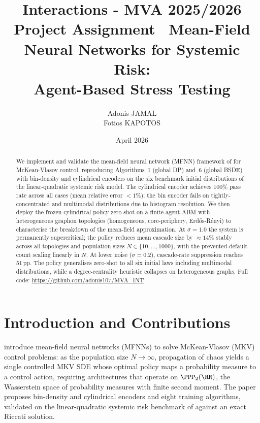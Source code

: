 \documentclass[11pt]{article}
\title{Interactions - MVA 2025/2026
      \\ \Large{Project Assignment}
      \ \Large{Mean-Field Neural Networks for Systemic Risk:\\Agent-Based Stress Testing}}
\author{
Adonis JAMAL \email{adonis.jamal@student-cs.fr}\\
Fotios KAPOTOS \email{fotiskapotos@gmail.com}
}
\date{April 2026}
\begin{document}
\maketitle


\begin{abstract}
We implement and validate the mean-field neural network (MFNN) framework of \citet{pham2024mfnn} for McKean-Vlasov control, reproducing Algorithms~1 (global DP) and~6 (global BSDE) with bin-density and cylindrical encoders on the six benchmark initial distributions of the linear-quadratic systemic risk model. The cylindrical encoder achieves 100\% pass rate across all cases (mean relative error $< 1\%$); the bin encoder fails on tightly-concentrated and multimodal distributions due to histogram resolution. We then deploy the frozen cylindrical policy zero-shot on a finite-agent ABM with heterogeneous graphon topologies (homogeneous, core-periphery, Erdős-Rényi) to characterise the breakdown of the mean-field approximation. At $\sigma = 1.0$ the system is permanently supercritical; the policy reduces mean cascade size by ${\approx}14\%$ stably across all topologies and population sizes $N \in \{10, \ldots, 1000\}$, with the prevented-default count scaling linearly in $N$. At lower noise ($\sigma = 0.2$), cascade-rate suppression reaches 51\,pp. The policy generalises zero-shot to all six initial laws including multimodal distributions, while a degree-centrality heuristic collapses on heterogeneous graphs. Full code: \url{https://github.com/adonis107/MVA_INT}
\end{abstract}


\section{Introduction and Contributions}

\citet{pham2024mfnn} introduce mean-field neural networks (MFNNs) to solve McKean-Vlasov (MKV) control problems: as the population size $N \to \infty$, propagation of chaos \citep{sznitman1991propagation} yields a single controlled MKV SDE whose optimal policy maps a probability measure to a control action, requiring architectures that operate on $\PPP_2(\RR)$, the Wasserstein space of probability measures with finite second moment. The paper proposes bin-density and cylindrical encoders and eight training algorithms, validated on the linear-quadratic systemic risk benchmark of \citet{carmona2015systemic} against an exact Riccati solution.
\end{document}
